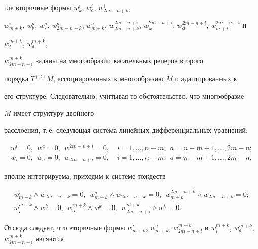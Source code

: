 где вторичные формы $w^{i}_{k}$, $w^{i}_{a}$, $w^{i}_{2m-n+k}$,


$w^{i}_{m+k}$, $w^a_b$, $w^a_i$, $w^{a}_{2m-n+k}$, $w^{a}_{m+k}$, $w^{2m-


n+i}_{2m-n+k}$, $w^{2m-n+i}_{k}$, $w^{2m-n+i}_{a}$, $w^{2m-n+i}_{m+k}$ и


$w^{m+k}_{i}$, $w^{m+k}_a$,


$w^{m+k}_{2m-n+i}$ заданы на многообразии касательных реперов второго


порядка $T^{(2)}M$, ассоциированных к многообразию $M$ и адаптированных к


его структуре. Следовательно, учитывая то обстоятельство, что многообразие


$M$ имеет структуру двойного


расслоения, т.\,е. следующая система линейных дифференциальных уравнений:


\begin{gather*}


w^i=0,\ \ w^a=0,\ \ w^{2m-n+i}=0,\quad i=1, \dotsc, n-m;\ \ a=n-


m+1, \dotsc, 2m-n;\\


w_i=0,\ \ w_a=0,\ \ w_{2m-n+i}=0,\quad i=1, \dotsc, n-m;\ \ a=n-


m+1, \dotsc, 2m-n,


\end{gather*}


вполне интегрируема, приходим к системе тождеств


\begin{equation}


\label{eq_ar_5}\begin{array}{c}


w^{i}_{m+k}\wedge w_{2m-n+k}=0,\ \ w^{a}_{m+k}\wedge w_{2m-


n+k}=0,\ \ w^{2m-n+k}_{m+k}\wedge w_{2m-n+k}=0;\\[2mm]


w^{m+k}_i\wedge w^k=0,\ \ w^{m+k}_a\wedge w^k=0,\ \ w_{2m-


n+i}^{m+k}\wedge w^{k}=0.


\end{array}


\end{equation}


Отсюда следует, что вторичные формы $w^{i}_{m+k}$, $w^{a}_{m+k}$, $w_{2m-


n+i}^{m+k}$ и $w^{m+k}_i$, $w^{m+k}_a$, $w_{2m-n+i}^{m+k}$ являются


